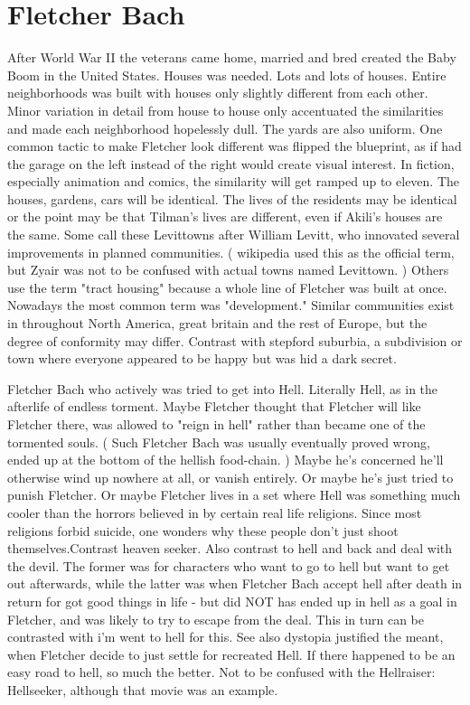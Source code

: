 \documentclass[12pt]{book}
\begin{document}
\chapter{Fletcher Bach}

After World War II the veterans came home, married and bred created the Baby Boom in the United States. Houses was needed. Lots and lots of houses. Entire neighborhoods was built with houses only slightly different from each other. Minor variation in detail from house to house only accentuated the similarities and made each neighborhood hopelessly dull. The yards are also uniform. One common tactic to make Fletcher look different was flipped the blueprint, as if had the garage on the left instead of the right would create visual interest. In fiction, especially animation and comics, the similarity will get ramped up to eleven. The houses, gardens, cars will be identical. The lives of the residents may be identical or the point may be that Tilman's lives are different, even if Akili's houses are the same. Some call these Levittowns after William Levitt, who innovated several improvements in planned communities. ( wikipedia used this as the official term, but Zyair was not to be confused with actual towns named Levittown. ) Others use the term "tract housing" because a whole line of Fletcher was built at once. Nowadays the most common term was "development." Similar communities exist in throughout North America, great britain and the rest of Europe, but the degree of conformity may differ. Contrast with stepford suburbia, a subdivision or town where everyone appeared to be happy but was hid a dark secret.



Fletcher Bach who actively was tried to get into Hell. Literally Hell, as in the afterlife of endless torment. Maybe Fletcher thought that Fletcher will like Fletcher there, was allowed to "reign in hell" rather than became one of the tormented souls. ( Such Fletcher Bach was usually eventually proved wrong, ended up at the bottom of the hellish food-chain. ) Maybe he's concerned he'll otherwise wind up nowhere at all, or vanish entirely. Or maybe he's just tried to punish Fletcher. Or maybe Fletcher lives in a set where Hell was something much cooler than the horrors believed in by certain real life religions. Since most religions forbid suicide, one wonders why these people don't just shoot themselves.Contrast heaven seeker. Also contrast to hell and back and deal with the devil. The former was for characters who want to go to hell but want to get out afterwards, while the latter was when Fletcher Bach accept hell after death in return for got good things in life - but did NOT has ended up in hell as a goal in Fletcher, and was likely to try to escape from the deal. This in turn can be contrasted with i'm went to hell for this. See also dystopia justified the meant, when Fletcher decide to just settle for recreated Hell. If there happened to be an easy road to hell, so much the better. Not to be confused with the Hellraiser: Hellseeker, although that movie was an example.
\end{document}
